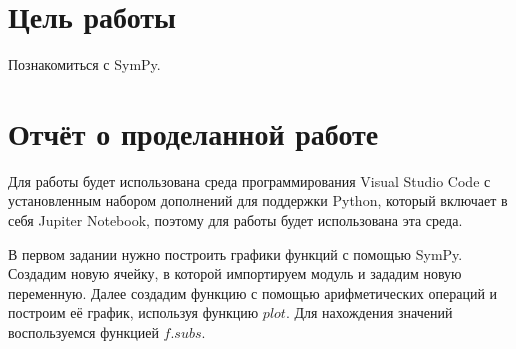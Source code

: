 \documentclass[14pt,a4paper]{extarticle}
\begin{document}


\section*{Цель работы}
Познакомиться с SymPy.

\section*{Отчёт о проделанной работе}
Для работы будет использована среда программирования Visual Studio
Code с установленным набором дополнений для поддержки Python, который
включает в себя Jupiter Notebook, поэтому для работы будет использована
эта среда.

В первом задании нужно построить графики функций с помощью SymPy.
Создадим новую ячейку, в которой импортируем модуль и зададим новую
переменную. Далее создадим функцию с помощью арифметических операций и
построим её график, используя функцию $plot$. Для нахождения значений
воспользуемся функцией $f.subs$.
\end{document}
